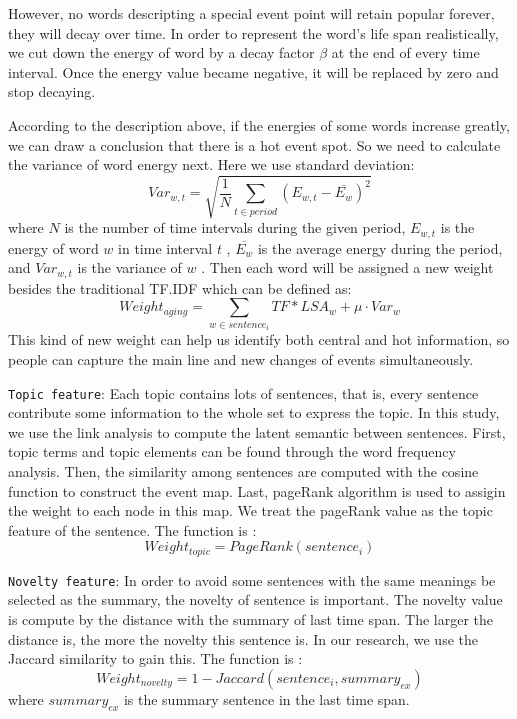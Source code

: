\documentclass{acm_proc_article-sp}
\begin{document}
However, no words descripting a special event point will retain popular forever, they will decay over time. In order to represent the word's life span realistically, we cut down the energy of word by a decay factor $\beta$ at the end of every time interval.
Once the energy value became negative, it will be replaced by zero and stop decaying.


According to the description above, if the energies of some words increase greatly, we can draw a conclusion that there is a hot event spot. So we need to calculate the variance of word energy next. Here we use standard deviation:
\begin{equation}
Var_{w,t} = \sqrt{ \frac{1}{N} \sum_{t \in period}(E_{w,t}- \overline{E_{w}})^2}
\end{equation}
where $N$ is the number of time intervals during the given period, $E_{w,t}$  is the energy of word $w$  in time interval $t$ , $\overline{E_{w}}$  is the average energy during the period, and $Var_{w,t}$  is the variance of $w$ .
Then each word will be assigned a new weight besides the traditional TF.IDF which can be defined as:
 \begin{equation}
Weight_{aging}=\sum_{w \in sentence_i}TF*LSA_{w} + \mu \cdot Var_{w}
\end{equation}
This kind of new weight can help us identify both central and hot information, so people can capture the main line and new changes of events simultaneously.

\texttt{Topic feature}: Each topic contains lots of sentences, that is, every sentence contribute some information to the whole set to express the topic. In this study, we use the link analysis to compute the latent semantic between sentences. First, topic terms and topic elements can be found through the word frequency analysis. Then, the similarity among sentences are computed with the cosine function to construct the event map. Last, pageRank algorithm is used to assigin the weight to each node in this map. We treat the pageRank value as the topic feature of the sentence. The function is :
\begin{equation}
Weight_{topic} = PageRank(sentence_i)
\end{equation}

\texttt{Novelty feature}: In order to avoid some sentences with the same meanings be selected as the summary, the novelty of sentence is important. The novelty value is compute by the distance with the summary of last time span. The larger the distance is, the more the novelty this sentence is. In our research, we use the Jaccard similarity to gain this. The function is :
\begin{equation}
Weight_{novelty} = 1 - Jaccard(sentence_i, summary_{ex})
\end{equation}
where $summary_{ex}$ is the summary sentence in the last time span.
\end{document}
